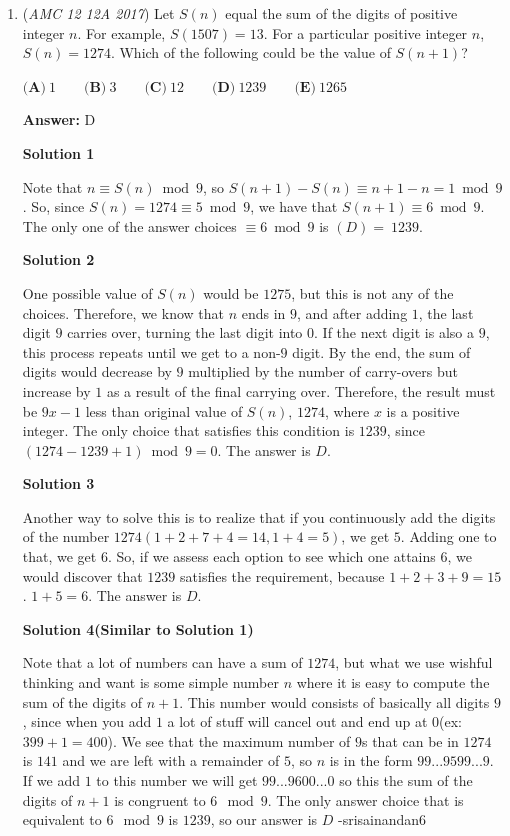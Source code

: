 \begin{enumerate}
 


	\item (\textit{AMC 12 12A 2017}) Let $S(n)$ equal the sum of the digits of positive integer $n$. For example, $S(1507) = 13$. For a particular positive integer $n$, $S(n) = 1274$. Which of the following could be the value of $S(n+1)$?


 $\textbf{(A)}\ 1 \qquad\textbf{(B)}\ 3\qquad\textbf{(C)}\ 12\qquad\textbf{(D)}\ 1239\qquad\textbf{(E)}\ 1265$

 \textbf{Answer: }D



\textbf{Solution 1}

Note that $n\equiv S(n)\bmod 9$, so $S(n+1)-S(n)\equiv n+1-n = 1\bmod 9$. So, since $S(n)=1274\equiv 5\bmod 9$, we have that $S(n+1)\equiv 6\bmod 9$. The only one of the answer choices $\equiv 6\bmod 9$ is $\boxed{(D)=\ 1239}$.

 



\textbf{Solution 2}

One possible value of $S(n)$ would be $1275$, but this is not any of the choices. Therefore, we know that $n$ ends in $9$, and after adding $1$, the last digit $9$ carries over, turning the last digit into $0$. If the next digit is also a $9$, this process repeats until we get to a non-$9$ digit. By the end, the sum of digits would decrease by $9$ multiplied by the number of carry-overs but increase by $1$ as a result of the final carrying over. Therefore, the result must be $9x-1$ less than original value of $S(n)$, $1274$, where $x$ is a positive integer. The only choice that satisfies this condition is $\boxed{1239}$, since $(1274-1239+1) \bmod 9 = 0$. The answer is $\boxed{D}$.

 



\textbf{Solution 3}

Another way to solve this is to realize that if you continuously add the digits of the number $1274 (1 + 2 + 7 + 4 = 14, 1 + 4 = 5)$, we get $5$. Adding one to that, we get $6$. So, if we assess each option to see which one attains $6$, we would discover that $1239$ satisfies the requirement, because $1 + 2 + 3 + 9 = 15$. $1 + 5 = 6$. The answer is $\boxed{D}$.

 



\textbf{Solution 4(Similar to Solution 1)}

Note that a lot of numbers can have a sum of $1274$, but what we use wishful thinking and want is some simple number $n$ where it is easy to compute the sum of the digits of $n+1$. This number would consists of basically all digits $9$, since when you add $1$ a lot of stuff will cancel out and end up at $0$(ex: $399+1=400$). We see that the maximum number of $9$s that can be in $1274$ is $141$ and we are left with a remainder of $5$, so $n$ is in the form $99...9599...9$. If we add $1$ to this number we will get $99...9600...0$ so this the sum of the digits of $n+1$ is congruent to $6 \mod 9$. The only answer choice that is equivalent to $6 \mod 9$ is $1239$, so our answer is $\boxed{D}$ -srisainandan6


\end{enumerate}
